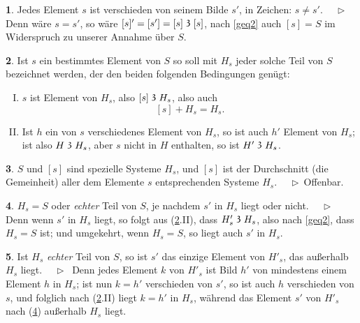 \documentclass[leqno,hidelinks,a4paper]{article}
\theoremstyle{definition}
\newtheorem{sat}{\protect\satname}
\newtheorem{tef}[sat]{\protect\tefname}
\newcommand{\satname}{}
\newcommand{\tefname}{}
\renewcommand{\satname}{\hspace{-4pt}. Satz}%
\renewcommand{\tefname}{\hspace{-4pt}. Definition}%
\renewcommand{\satname}{\hspace{-4pt}. Theorem}%
\renewcommand{\tefname}{\hspace{-4pt}. Definition}%
\newcommand\Beweis{\newline $ \phantom{'.'} \rhd \ $}%
\newcommand\TeilVon{\mathrel{\raisebox{0.45ex}{$\mathfrak{3}$}}}
\begin{document}
\begin{paracol}{2}
\smallskip

\begin{sat}\label{gthm2}
Jedes Element $s$ ist verschieden von seinem Bilde $s'$, in Zeichen: $s \neq s'$.
\Beweis
Denn wäre $s = s'$, so wäre $[s]' = [s'] = [s] \TeilVon [s]$, nach \eqref{geq2}
auch $[s] = S$ im Widerspruch zu unserer Annahme über $S$.
\end{sat}

\newpage

\begin{tef}\label{gdef3}
Ist $s$ ein bestimmtes Element von $S$ so soll mit $H_s$ jeder solche Teil von
$S$ bezeichnet werden, der den beiden folgenden Bedingungen genügt:
\begin{enumerate}[I.]
\item $s$ ist Element von $H_s$, also $[s] \TeilVon H_s$, also auch
\[
	[s] + H_s = H_s.
\]
\item Ist $h$ ein von $s$ verschiedenes Element von $H_s$, so ist auch $h'$
Element von $H_s$; ist also $H \TeilVon H_s$, aber $s$ nicht in $H$ enthalten,
so ist $H' \TeilVon H_s$.
\end{enumerate}
\end{tef}

\begin{sat}\label{gthm4}
$S$ und $[s]$ sind spezielle Systeme $H_s$, und $[s]$ ist der Durchschnitt
(die Gemeinheit) aller dem Elemente $s$ entsprechenden Systeme $H_s$.
\Beweis Offenbar.
\end{sat}

\begin{sat}\label{gthm5}
$H_s = S$ oder \textit{echter} Teil von $S$, je nachdem $s'$ in $H_s$ liegt oder nicht.
\Beweis
Denn wenn $s'$ in $H_s$ liegt, so folgt aus (\ref{gdef3}.II), dass $H'_s \TeilVon H_s$,
also nach \eqref{geq2}, dass $H_s = S$ ist; und umgekehrt, wenn $H_s = S$, so liegt
auch $s'$ in $H_s$.
\end{sat}

\begin{sat}\label{gthm6}
Ist $H_s$ \emph{echter} Teil von $S$, so ist $s'$ das einzige Element von $H'_s$,
das außerhalb $H_s$ liegt.
\Beweis
Denn jedes Element $k$ von $H'_s$ ist Bild $h'$ von mindestens einem Element $h$
in $H_s$; ist nun $k=h'$ verschieden von $s'$, so ist auch $h$ verschieden von $s$,
und folglich nach (\ref{gdef3}.II) liegt $k = h'$ in $H_s$, während das Element $s'$
von $H'_s$ nach (\ref{gthm5}) außerhalb $H_s$ liegt.
\end{sat}


\end{paracol}
\end{document}
